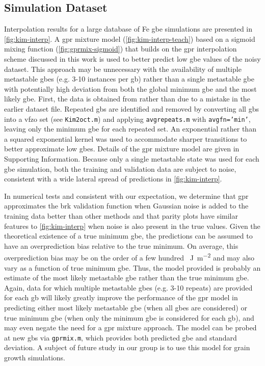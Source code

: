 \documentclass[final,twocolumn,12pt]{elsarticle}
\begin{document}
\subsection{Simulation Dataset}
Interpolation results for a large database of Fe \gls{gbe} simulations \cite{kimPhasefieldModeling3D2014} are presented in \cref{fig:kim-interp}. A \gls{gpr} mixture model (\cref{fig:kim-interp-teach}) based on a sigmoid mixing function (\cref{fig:gprmix-sigmoid}) that builds on the \gls{gpr} interpolation scheme discussed in this work is used to better predict low \gls{gbe} values of the noisy dataset. This approach may be unnecessary with the availability of multiple metastable \glspl{gbe} (e.g. 3-10 instances per \gls{gb}) rather than a single metastable \gls{gbe} with potentially high deviation from both the global minimum \gls{gbe} and the most likely \gls{gbe}. First, the data is obtained from \cite{kimPhasefieldModeling3D2014} rather than \cite{kimIdentificationSchemeGrain2011} due to a mistake in the earlier dataset file. Repeated \glspl{gb} are identified and removed by converting all \glspl{gb} into a \gls{vfzo} set (see \texttt{Kim2oct.m}) and applying \texttt{avgrepeats.m} with \texttt{avgfn='min'}, leaving only the minimum \gls{gbe} for each repeated set. An exponential rather than a squared exponential kernel was used to accommodate sharper transitions to better approximate low \glspl{gbe}. Details of the \gls{gpr} mixture model are given in Supporting Information. Because only a single metastable state was used for each \gls{gbe} simulation, both the training and validation data are subject to noise, consistent with a wide lateral spread of predictions in \cref{fig:kim-interp}.

In numerical tests and consistent with our expectation, we determine that \gls{gpr} approximates the \gls{brk} validation function when Gaussian noise is added to the training data better than other methods and that parity plots have similar features to \cref{fig:kim-interp} when noise is also present in the true values. Given the theoretical existence of a true minimum \gls{gbe}, the predictions can be assumed to have an overprediction bias relative to the true minimum. On average, this overprediction bias may be on the order of a few hundred \SI{}{\J\per\square\meter} and may also vary as a function of true minimum \gls{gbe}. Thus, the model provided is probably an estimate of the most likely metastable \gls{gbe} rather than the true minimum \gls{gbe}. Again, data for which multiple metastable \glspl{gbe} (e.g. 3-10 repeats) are provided for each \gls{gb} will likely greatly improve the performance of the \gls{gpr} model in predicting either most likely metastable \gls{gbe} (when all \glspl{gbe} are considered) or true minimum \gls{gbe} (when only the minimum \gls{gbe} is considered for each \gls{gb}), and may even negate the need for a \gls{gpr} mixture approach. The model can be probed at new \glspl{gb} via \texttt{gprmix.m}, which provides both predicted \gls{gbe} and standard deviation. A subject of future study in our group is to use this model for grain growth simulations.
\end{document}
